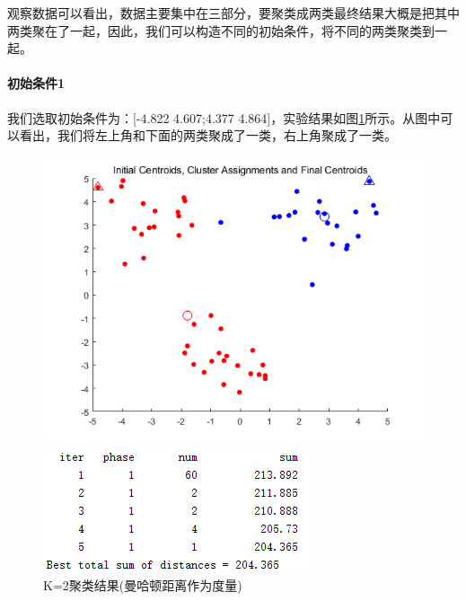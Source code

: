 \documentclass[cn]{elegantbook}
\begin{document}
观察数据可以看出，数据主要集中在三部分，要聚类成两类最终结果大概是把其中两类聚在了一起，因此，我们可以构造不同的初始条件，将不同的两类聚类到一起。

\paragraph{初始条件1}
我们选取初始条件为：[-4.822 4.607;4.377 4.864]，实验结果如图\ref{res21}所示。从图中可以看出，我们将左上角和下面的两类聚成了一类，右上角聚成了一类。
\begin{figure}[!h]
	\centering
	\begin{minipage}{0.48\linewidth}
		\centering
		\includegraphics[width=\linewidth]{images/res21}
	\end{minipage}
	\begin{minipage}{0.48\linewidth}
		\centering
		\includegraphics[width=\linewidth]{images/res211}
	\end{minipage}
	\caption{\label{res21}K=2聚类结果(曼哈顿距离作为度量)}
\end{figure}
\end{document}
